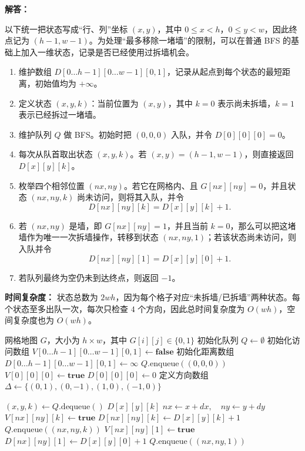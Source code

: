 ﻿\documentclass[12pt,a4paper]{article}
\begin{document}
\begin{answerbox}
\textbf{解答：}

以下统一把状态写成“行、列”坐标 $(x,y)$，其中 $0 \le x < h$，$0 \le y < w$，因此终点记为 $(h-1,w-1)$。为处理“最多移除一堵墙”的限制，可以在普通 BFS 的基础上加入一维状态，记录是否已经使用过拆墙机会。

\begin{enumerate}
    \item 维护数组 $D[0 \dots h-1][0 \dots w-1][0,1]$，记录从起点到每个状态的最短距离，初始值均为 $+\infty$。
    \item 定义状态 $(x,y,k)$：当前位置为 $(x,y)$，其中 $k=0$ 表示尚未拆墙，$k=1$ 表示已经拆过一堵墙。
    \item 维护队列 $Q$ 做 BFS。初始时把 $(0,0,0)$ 入队，并令 $D[0][0][0]=0$。
    \item 每次从队首取出状态 $(x,y,k)$。若 $(x,y)=(h-1,w-1)$，则直接返回 $D[x][y][k]$。
    \item 枚举四个相邻位置 $(nx,ny)$。若它在网格内、且 $G[nx][ny]=0$，并且状态 $(nx,ny,k)$ 尚未访问，则将其入队，并令
    \[
    D[nx][ny][k] = D[x][y][k] + 1.
    \]
    \item 若 $(nx,ny)$ 是墙，即 $G[nx][ny]=1$，并且当前 $k=0$，那么可以把这堵墙作为唯一一次拆墙操作，转移到状态 $(nx,ny,1)$；若该状态尚未访问，则入队并令
    \[
    D[nx][ny][1] = D[x][y][0] + 1.
    \]
    \item 若队列最终为空仍未到达终点，则返回 $-1$。
\end{enumerate}

\textbf{时间复杂度：} 状态总数为 $2wh$，因为每个格子对应“未拆墙/已拆墙”两种状态。每个状态至多出队一次，每次只检查 $4$ 个方向，因此总时间复杂度为 $O(wh)$，空间复杂度也为 $O(wh)$。

\begin{algorithm}[H]
\caption{允许破墙一次的 BFS 算法}
\label{alg:3d-bfs-chinese}
\begin{algorithmic}[1]
\REQUIRE 网格地图 $G$，大小为 $h \times w$，其中 $G[i][j] \in \{0,1\}$
\STATE 初始化队列 $Q \gets \emptyset$
\STATE 初始化访问数组 $V[0 \dots h-1][0 \dots w-1][0,1] \gets \textbf{false}$
\STATE 初始化距离数组 $D[0 \dots h-1][0 \dots w-1][0,1] \gets \infty$
\STATE $Q.\text{enqueue}((0,0,0))$
\STATE $V[0][0][0] \gets \textbf{true}$
\STATE $D[0][0][0] \gets 0$
\STATE 定义方向数组 $\Delta \gets \{(0,1),(0,-1),(1,0),(-1,0)\}$

    \STATE $(x,y,k) \gets Q.\text{dequeue}()$
        \RETURN $D[x][y][k]$
    \ENDIF
        \STATE $nx \gets x + dx,\quad ny \gets y + dy$
                \STATE $V[nx][ny][k] \gets \textbf{true}$
                \STATE $D[nx][ny][k] \gets D[x][y][k] + 1$
                \STATE $Q.\text{enqueue}((nx,ny,k))$
                \STATE $V[nx][ny][1] \gets \textbf{true}$
                \STATE $D[nx][ny][1] \gets D[x][y][0] + 1$
                \STATE $Q.\text{enqueue}((nx,ny,1))$
            \ENDIF
        \ENDIF
    \ENDFOR
\ENDWHILE


\end{algorithmic}
\end{algorithm}
\end{answerbox}
\end{document}
